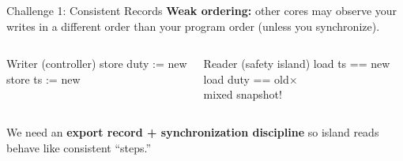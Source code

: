 \documentclass[aspectratio=169,12pt]{beamer}
\newcommand{\hl}[1]{\textcolor{Accent}{\textbf{#1}}}
\newcommand{\SafetyIsland}{safety island\xspace}
\begin{document}
\begin{frame}{Challenge 1: Consistent Records}
\textbf{Weak ordering:} other cores may observe your writes in a different order than your program order (unless you synchronize).

\vspace{0.6em}
\begin{columns}[T,onlytextwidth]
  \begin{block}{Writer (controller)}
  {\ttfamily
  store duty := new\quad\checkmark\\
  store ts\;\;\; := new\quad\checkmark}
  \end{block}

  \begin{alertblock}{Reader (\SafetyIsland)}
  {\ttfamily
  load ts\;\;\; == new\quad\checkmark\\
  load duty == old\quad$\times$}\\[2pt]
  {\small\color{Accent} mixed snapshot!}
  \end{alertblock}
\end{columns}

\vspace{0.8em}
We need an \hl{export record + synchronization discipline} so island reads behave like consistent ``steps.''
\end{frame}
\end{document}
